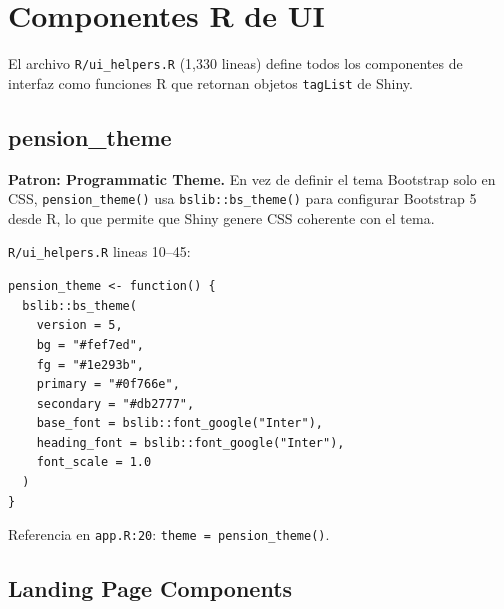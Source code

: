 \documentclass[11pt, letterpaper, twoside]{report}
\begin{document}
\section{Componentes R de UI}
\label{sec:ui_components}

El archivo \texttt{R/ui\_helpers.R} (1,330 lineas) define todos los componentes de
interfaz como funciones R que retornan objetos \texttt{tagList} de Shiny.

\subsection{pension\_theme}

\begin{patronbox}
\textbf{Patron: Programmatic Theme.} En vez de definir el tema Bootstrap solo
en CSS, \texttt{pension\_theme()} usa \texttt{bslib::bs\_theme()} para configurar
Bootstrap 5 desde R, lo que permite que Shiny genere CSS coherente con el tema.
\end{patronbox}

\begin{codigobox}
\texttt{R/ui\_helpers.R} lineas 10--45:
\begin{lstlisting}[caption={Tema Bootstrap 5 programatico}]
pension_theme <- function() {
  bslib::bs_theme(
    version = 5,
    bg = "#fef7ed",
    fg = "#1e293b",
    primary = "#0f766e",
    secondary = "#db2777",
    base_font = bslib::font_google("Inter"),
    heading_font = bslib::font_google("Inter"),
    font_scale = 1.0
  )
}
\end{lstlisting}
Referencia en \texttt{app.R:20}: \texttt{theme = pension\_theme()}.
\end{codigobox}


\subsection{Landing Page Components}
\end{document}
